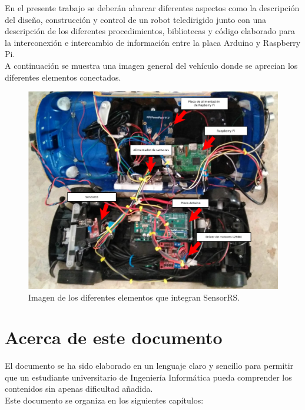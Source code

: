 En el presente trabajo se deberán abarcar diferentes aspectos como la descripción del diseño, construcción y control de un robot teledirigido junto con una descripción de los 
diferentes procedimientos, bibliotecas y código elaborado para la interconexión e intercambio de información entre la placa Arduino y Raspberry Pi.\\

A continuación se muestra una imagen general del vehículo donde se aprecian los diferentes elementos conectados.\\

\begin{figure}[H]
  \begin{center}
    \includegraphics[scale=0.3]{diagramas/conexionado_etiquetas_general.png}
  \end{center}
  \caption{ Imagen de los diferentes elementos que integran SensorRS.}
  \label{diagrama:representacion_sistema}
\end{figure}

\section{Acerca de este documento}

El documento se ha sido elaborado en un lenguaje claro y sencillo para permitir que un estudiante universitario de Ingeniería Informática pueda comprender los contenidos sin apenas dificultad añadida.\\

Este documento se organiza en los siguientes capítulos:\\

